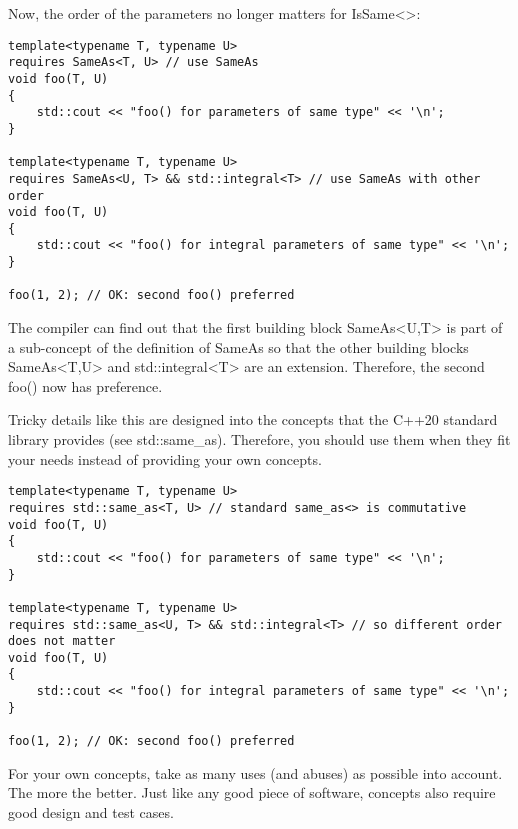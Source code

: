 Now, the order of the parameters no longer matters for IsSame<>:


\begin{lstlisting}[style=styleCXX]
template<typename T, typename U>
requires SameAs<T, U> // use SameAs
void foo(T, U)
{
	std::cout << "foo() for parameters of same type" << '\n';
}

template<typename T, typename U>
requires SameAs<U, T> && std::integral<T> // use SameAs with other order
void foo(T, U)
{
	std::cout << "foo() for integral parameters of same type" << '\n';
}

foo(1, 2); // OK: second foo() preferred
\end{lstlisting}

The compiler can find out that the first building block SameAs<U,T> is part of a sub-concept of the definition of SameAs so that the other building blocks SameAs<T,U> and std::integral<T> are an extension. Therefore, the second foo() now has preference.

Tricky details like this are designed into the concepts that the C++20 standard library provides (see std::same\_as). Therefore, you should use them when they fit your needs instead of providing your own concepts.

\begin{lstlisting}[style=styleCXX]
template<typename T, typename U>
requires std::same_as<T, U> // standard same_as<> is commutative
void foo(T, U)
{
	std::cout << "foo() for parameters of same type" << '\n';
}

template<typename T, typename U>
requires std::same_as<U, T> && std::integral<T> // so different order does not matter
void foo(T, U)
{
	std::cout << "foo() for integral parameters of same type" << '\n';
}

foo(1, 2); // OK: second foo() preferred
\end{lstlisting}

For your own concepts, take as many uses (and abuses) as possible into account. The more the better. Just like any good piece of software, concepts also require good design and test cases.












